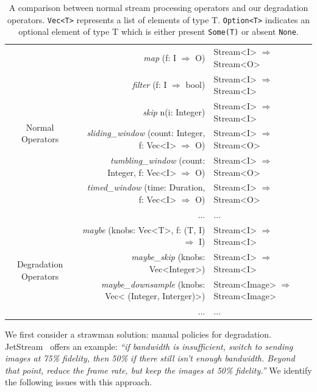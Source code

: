 \begin{table}
  \centering
  \begin{tabular}{ c r l }
    \toprule
    \multirow{7}{*}{Normal Operators}
    & \textit{map} (f: I $\Rightarrow$ O) & Stream<I> $\Rightarrow$ Stream<O> \\
    & \textit{filter} (f: I $\Rightarrow$ bool) & Stream<I> $\Rightarrow$
                                                 Stream<I> \\
    & \textit{skip} n(i: Integer) & Stream<I> $\Rightarrow$ Stream<I> \\
    & \textit{sliding\_window} (count: Integer, f: Vec<I> $\Rightarrow$ O) & Stream<I> $\Rightarrow$
                                                                            Stream<O> \\
    & \textit{tumbling\_window} (count: Integer, f: Vec<I> $\Rightarrow$ O) & Stream<I> $\Rightarrow$
                                                                             Stream<O> \\
    & \textit{timed\_window} (time: Duration, f: Vec<I> $\Rightarrow$ O) & Stream<I> $\Rightarrow$
                                                                          Stream<O> \\
    & ... & ... \\
    \midrule
    \multirow{4}{*}{Degradation Operators}
    & \textit{maybe} (knobs: Vec<T>, f:  (T, I) $\Rightarrow$ I) & Stream<I> $\Rightarrow$
                                                                 Stream<I> \\
    & \textit{maybe\_skip} (knobs: Vec<Integer>) & Stream<I> $\Rightarrow$ Stream<I> \\
    & \textit{maybe\_downsample} (knobs: Vec< (Integer, Interger)>) & Stream<Image> $\Rightarrow$ Stream<Image> \\
    & ... & ... \\
    \bottomrule
  \end{tabular}
  \caption{A comparison between normal stream processing operators and our
    degradation operators. \texttt{Vec<T>} represents a list of elements of type
    T. \texttt{Option<T>} indicates an optional element of type T which is
    either present \texttt{Some(T)} or absent \texttt{None}.}
  \label{tab:operators}
\end{table}

We first consider a strawman solution: manual policies for
degradation. JetStream~\cite{rabkin2014aggregation} offers an example: \textit{``if
bandwidth is insufficient, switch to sending images at 75\% fidelity, then 50\%
if there still isn't enough bandwidth. Beyond that point, reduce the frame rate,
but keep the images at 50\% fidelity.''} We identify the following issues with
this approach.

